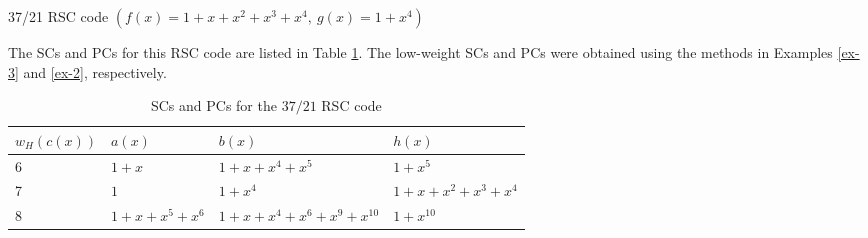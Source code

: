 \begin{example}{37/21 RSC code $\left( f(x)=1+x+x^2+x^3+x^4 , ~g(x)=1+x^4\right)$}
	
	The  SCs and PCs for this RSC code are listed in Table \ref{novelTab14}.
	The low-weight SCs and PCs were obtained using the methods in Examples \ref{ex-3} and \ref{ex-2}, respectively. 
	\begin{table}[htbp]
		\caption{SCs and PCs for the $37/21$ RSC code}
		\centering
		\begin{tabularx}{0.75\textwidth}{Xlll} 
			\toprule
			$w_H(c(x))$&$a(x)$ & $b(x)$ & $h(x)$ \\ [0.5ex] 
			\midrule
			6&$1+x$ & $1+x+x^{4}+x^5$ & $1+x^5$\\
			\hline
			7&$1$ & $1+x^4$ & $1+x+x^2+x^3+x^4$\\
			\hline
			8&$1+x+x^5+x^6$ & $1+x+x^4+x^6+x^9+x^{10}$ & $1+x^{10}$\\
			\bottomrule
		\end{tabularx}
		
		\label{novelTab14}
	\end{table}
	\label{ex-7}
\end{example}

